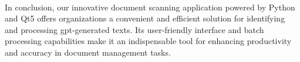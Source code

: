 \paragraph{}
In conclusion, our innovative document scanning application powered by Python and Qt5 offers organizations a 
convenient and efficient solution for identifying and processing gpt-generated texts. Its user-friendly 
interface and batch processing capabilities make it an indispensable tool for enhancing productivity and accuracy 
in document management tasks.

